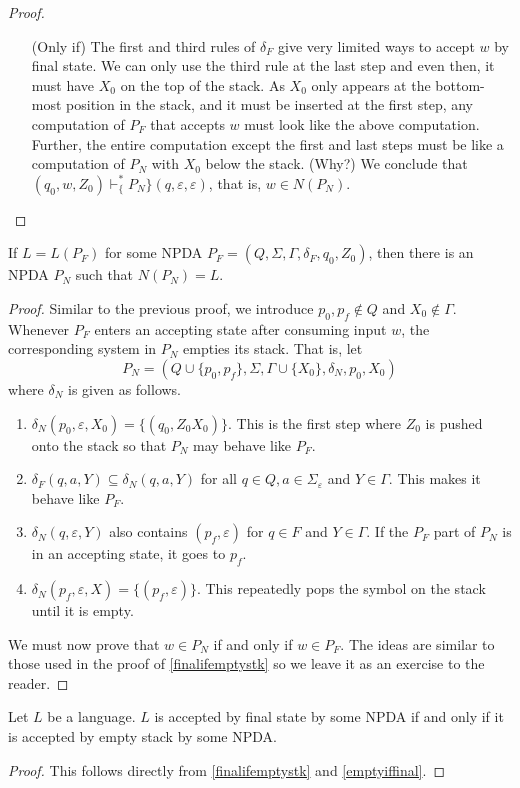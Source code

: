 \begin{proof}
\begin{itemize}
    \item[(Only if)] The first and third rules of $\delta_F$ give very limited ways to accept $w$ by final state. We can only use the third rule at the last step and even then, it must have $X_0$ on the top of the stack. As $X_0$ only appears at the bottom-most position in the stack, and it must be inserted at the first step, any computation of $P_F$ that accepts $w$ must look like the above computation. Further, the entire computation except the first and last steps must be like a computation of $P_N$ with $X_0$ below the stack. (Why?) We conclude that $(q_0,w,Z_0)\vdash^*_\{P_N\}(q,\varepsilon,\varepsilon)$, that is, $w\in N(P_N)$.  
\end{itemize}
\end{proof}

\begin{lemma}
\label{emptyiffinal}
    If $L=L(P_F)$ for some NPDA $P_F=(Q,\Sigma,\Gamma,\delta_F,q_0,Z_0)$, then there is an NPDA $P_N$ such that $N(P_N)=L$.
\end{lemma}
\begin{proof}
Similar to the previous proof, we introduce $p_0,p_f\not\in Q$ and $X_0\not\in\Gamma$. Whenever $P_F$ enters an accepting state after consuming input $w$, the corresponding system in $P_N$ empties its stack. That is, let
$$P_N=(Q\cup\{p_0,p_f\}, \Sigma, \Gamma\cup\{X_0\}, \delta_N, p_0, X_0)$$
where $\delta_N$ is given as follows.
\begin{enumerate}
    \item $\delta_N(p_0,\varepsilon,X_0)=\{(q_0,Z_0X_0)\}$. This is the first step where $Z_0$ is pushed onto the stack so that $P_N$ may behave like $P_F$.
    \item $\delta_F(q,a,Y)\subseteq\delta_N(q,a,Y)$ for all $q\in Q, a\in\Sigma_\varepsilon$ and $Y\in\Gamma$. This makes it behave like $P_F$.
    \item $\delta_N(q,\varepsilon,Y)$ also contains $(p_f,\varepsilon)$ for $q\in F$ and $Y\in\Gamma$. If the $P_F$ part of $P_N$ is in an accepting state, it goes to $p_f$.
    \item $\delta_N(p_f,\varepsilon,X)=\{(p_f,\varepsilon)\}$. This repeatedly pops the symbol on the stack until it is empty.
\end{enumerate}

    We must now prove that $w\in P_N$ if and only if $w\in P_F$. The ideas are similar to those used in the proof of \ref{finalifemptystk} so we leave it as an exercise to the reader.
\end{proof}

\begin{theorem}
Let $L$ be a language. $L$ is accepted by final state by some NPDA if and only if it is accepted by empty stack by some NPDA.
\end{theorem}
\begin{proof}
This follows directly from \ref{finalifemptystk} and \ref{emptyiffinal}.
\end{proof}